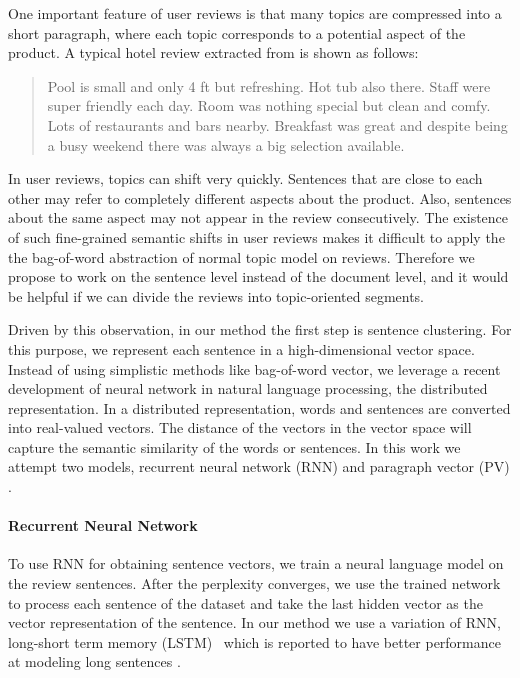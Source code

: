 One important feature of user reviews is that many topics are 
compressed into a short paragraph, where each topic corresponds to 
a potential aspect of the product. 
A typical hotel review extracted from  
is shown as follows:

\begin{quote}
Pool is small and only 4 ft but refreshing. Hot tub also there. Staff were super friendly each day. Room was nothing special but clean and comfy. Lots of restaurants and bars nearby. Breakfast was great and despite being a busy weekend there was always a big selection available.
\end{quote}

In user reviews, topics can shift very quickly.
Sentences that are close to each other may refer to 
completely different aspects about the product. Also,
sentences about the same aspect may not appear in the review consecutively. 
The existence of such fine-grained semantic shifts in user reviews 
makes it difficult to apply the the bag-of-word abstraction 
of normal topic model on reviews.
Therefore we propose to work on the sentence level instead 
of the document level, and it would be helpful if we can divide the 
reviews into topic-oriented segments.

Driven by this observation, in our method the first step is 
sentence clustering.  For this purpose, we represent each 
sentence in a high-dimensional vector space.
Instead of using simplistic methods like bag-of-word vector, 
we leverage a recent development of neural network in natural 
language processing, the distributed representation.
In a distributed representation, words and sentences are 
converted into real-valued vectors.
The distance of the vectors in the vector space will capture the 
semantic similarity of the words or sentences.
In this work we attempt two models, recurrent neural network (RNN) and paragraph vector (PV) \cite{le2014distributed}.

\paragraph{Recurrent Neural Network}
To use RNN for obtaining sentence vectors, 
we train a neural language model on the review sentences. 
After the perplexity converges, we use the trained network to 
process each sentence of the dataset and take the last hidden vector as 
the vector representation of the sentence. In our method we use a 
variation of RNN, long-short term memory (LSTM)~\cite{hochreiter1997long} 
which is reported to have better performance at 
modeling long sentences \cite{jozefowicz2015empirical}.

